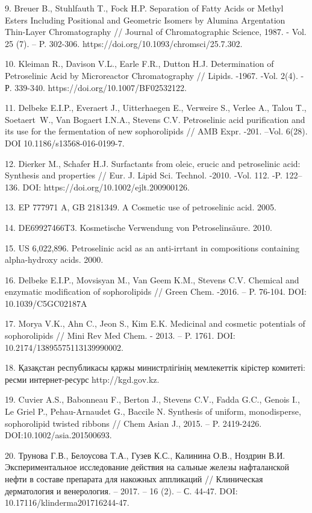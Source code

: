 9. Breuer B., Stuhlfauth T., Fock H.P. Separation of Fatty Acids or
Methyl Esters Including Positional and Geometric Isomers by Alumina
Argentation Thin-Layer Chromatography // Journal of Chromatographic
Science, 1987. - Vol. 25 (7). -- P. 302-306.
https://doi.org/10.1093/chromsci/25.7.302.

10. Kleiman R., Davison V.L., Earle F.R., Dutton H.J. Determination of
Petroselinic Acid by Microreactor Chromatography // Lipids. -1967. -Vol.
2(4). - Р. 339-340. https://doi.org/10.1007/BF02532122.

11. Delbeke E.I.P., Everaert J., Uitterhaegen E., Verweire S., Verlee
A., Talou T., Soetaert~W., Van Bogaert I.N.A., Stevens C.V. Petroselinic
acid purification and its use for the fermentation of new sophorolipids
// AMB Expr. -201. --Vol. 6(28). DOI 10.1186/s13568-016-0199-7.

12. Dierker M., Schafer H.J. Surfactants from oleic, erucic and
petroselinic acid: Synthesis and properties // Eur. J. Lipid Sci.
Technol. -2010. -Vol. 112. -P. 122--136. DOI:
https://doi.org/10.1002/ejlt.200900126.

13. EP 777971 A, GB 2181349. A Cosmetic use of petroselinic acid. 2005.

14. DE69927466T3. Kosmetische Verwendung von Petroselinsäure. 2010.

15. US 6,022,896. Petroselinic acid as an anti-irrtant in compositions
containing alpha-hydroxy acids. 2000.

16. Delbeke E.I.P., Movsisyan M., Van Geem K.M., Stevens C.V. Chemical
and enzymatic modification of sophorolipids // Green Chem. -2016. -- P.
76-104. DOI: 10.1039/C5GC02187A

17. Morya V.K., Ahn C., Jeon S., Kim E.K. Medicinal and cosmetic
potentials of sophorolipids // Mini Rev Med Chem. - 2013. -- P. 1761.
DOI: 10.2174/13895575113139990002.

18. Қазақстан республикасы қаржы министрлігінің мемлекеттік кірістер
комитеті: ресми интернет-ресурс http://kgd.gov.kz.

19. Cuvier A.S., Babonneau F., Berton J., Stevens C.V., Fadda G.C.,
Genois I., Le Griel P., Pehau-Arnaudet G., Baccile N. Synthesis of
uniform, monodisperse, sophorolipid twisted ribbons // Chem Asian J.,
2015. -- P. 2419-2426. DOI:10.1002/asia.201500693.

20. Трунова Г.В., Белоусова Т.А., Гузев К.С., Калинина О.В., Ноздрин
В.И. Экспериментальное исследование действия на сальные железы
нафталанской нефти в составе препарата для накожных аппликаций //
Клиническая дерматология и венерология. -- 2017. -- 16 (2). -- С. 44‑47.
DOI: 10.17116/klinderma201716244-47.

